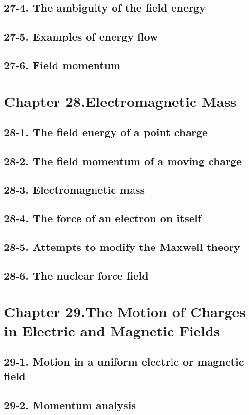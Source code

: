 \documentclass{article}
\begin{document}
\subsection{27-4. The ambiguity of the field energy}
\subsection{27-5. Examples of energy flow}
\subsection{27-6. Field momentum}
\section{Chapter 28.Electromagnetic Mass}
\subsection{28-1. The field energy of a point charge}
\subsection{28-2. The field momentum of a moving charge}
\subsection{28-3. Electromagnetic mass}
\subsection{28-4. The force of an electron on itself}
\subsection{28-5. Attempts to modify the Maxwell theory}
\subsection{28-6. The nuclear force field}
\section{Chapter 29.The Motion of Charges in Electric and Magnetic Fields}
\subsection{29-1. Motion in a uniform electric or magnetic field}
\subsection{29-2. Momentum analysis}
\end{document}
